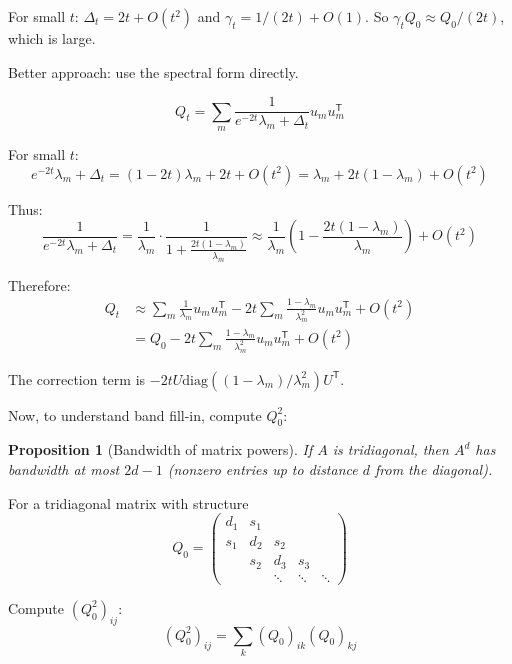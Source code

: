 \documentclass[11pt,a4paper]{article}
\theoremstyle{plain}
\newtheorem{proposition}[theorem]{Proposition}
\theoremstyle{definition}
\newcommand{\Prec}{Q}
\newcommand{\delt}{\Delta_t}
\newcommand{\tr}{\mathsf{T}}
\begin{document}
For small $t$: $\delt = 2t + O(t^2)$ and $\gamma_t = 1/(2t) + O(1)$. So $\gamma_t \Prec_0 \approx \Prec_0/(2t)$, which is large.

Better approach: use the spectral form directly.

\begin{equation}
\Prec_t = \sum_m \frac{1}{e^{-2t}\lambda_m + \delt} u_m u_m^\tr
\end{equation}

For small $t$:
\begin{equation}
e^{-2t}\lambda_m + \delt = (1-2t)\lambda_m + 2t + O(t^2) = \lambda_m + 2t(1-\lambda_m) + O(t^2)
\end{equation}

Thus:
\begin{equation}
\frac{1}{e^{-2t}\lambda_m + \delt} = \frac{1}{\lambda_m}\cdot\frac{1}{1 + \frac{2t(1-\lambda_m)}{\lambda_m}} \approx \frac{1}{\lambda_m}\left(1 - \frac{2t(1-\lambda_m)}{\lambda_m}\right) + O(t^2)
\end{equation}

Therefore:
\begin{align}
\Prec_t &\approx \sum_m \frac{1}{\lambda_m} u_m u_m^\tr - 2t\sum_m \frac{1-\lambda_m}{\lambda_m^2} u_m u_m^\tr + O(t^2) \\
&= \Prec_0 - 2t \sum_m \frac{1-\lambda_m}{\lambda_m^2} u_m u_m^\tr + O(t^2)
\end{align}

The correction term is $-2t U \text{diag}((1-\lambda_m)/\lambda_m^2) U^\tr$.

Now, to understand band fill-in, compute $\Prec_0^2$:

\begin{proposition}[Bandwidth of matrix powers]
If $A$ is tridiagonal, then $A^d$ has bandwidth at most $2d-1$ (nonzero entries up to distance $d$ from the diagonal).
\end{proposition}

For a tridiagonal matrix with structure
\begin{equation}
\Prec_0 = \begin{pmatrix}
d_1 & s_1 & & & \\
s_1 & d_2 & s_2 & & \\
& s_2 & d_3 & s_3 & \\
& & \ddots & \ddots & \ddots
\end{pmatrix}
\end{equation}

Compute $(\Prec_0^2)_{ij}$:
\begin{equation}
(\Prec_0^2)_{ij} = \sum_k (\Prec_0)_{ik} (\Prec_0)_{kj}
\end{equation}
\end{document}
